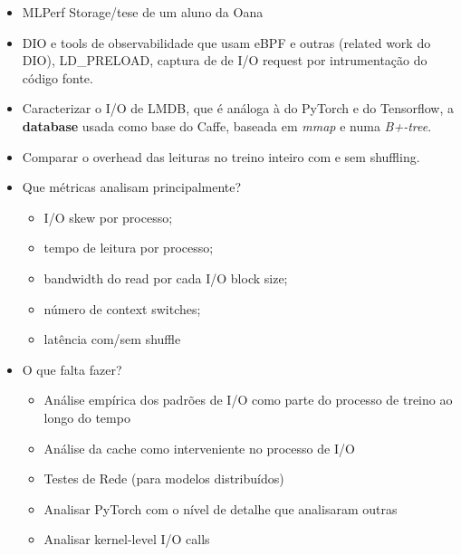 \documentclass[conference]{IEEEtran}
\begin{document}
\begin{itemize}
	\item MLPerf Storage/tese de um aluno da Oana
	\item DIO e tools de observabilidade que usam eBPF e outras (related work do DIO), LD\_PRELOAD, captura de de I/O request por intrumentação do código fonte.
	\item Caracterizar o I/O de LMDB, que é análoga à do PyTorch e do Tensorflow, a \textbf{database} usada como base do Caffe, baseada em \textit{mmap} e numa \textit{B+-tree}. \cite{LMDB}
	\item Comparar o overhead das leituras no treino inteiro com e sem shuffling. \cite{initial}
	\item Que métricas analisam principalmente?
	      \begin{itemize}
		      \item I/O skew por processo;
		      \item tempo de leitura por processo;
		      \item bandwidth do read por cada I/O block size;
		      \item número de context switches;
		      \item latência com/sem shuffle
	      \end{itemize}
	\item O que falta fazer?
	      \begin{itemize}
		      \item Análise empírica dos padrões de I/O como parte do processo de treino ao longo do tempo
		      \item Análise da cache como interveniente no processo de I/O
		      \item Testes de Rede (para modelos distribuídos)
		      \item Analisar PyTorch com o nível de detalhe que analisaram outras
		      \item Analisar kernel-level I/O calls
	      \end{itemize}
\end{itemize}
\end{document}
